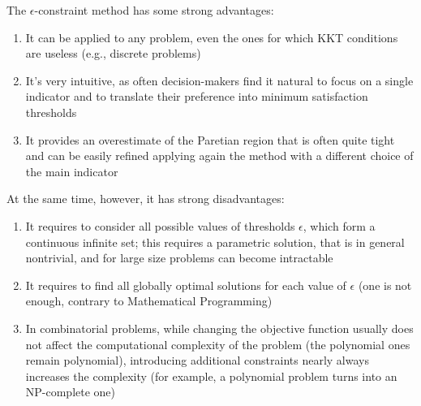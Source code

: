 The $\epsilon$-constraint method has some strong advantages:
\begin{enumerate}
	\item It can be applied to any problem, even the ones for which KKT conditions are useless (e.g., discrete problems)
	
	\item It's very intuitive, as often decision-makers find it natural to focus on a single indicator and to translate their preference into minimum satisfaction thresholds
	
	\item It provides an overestimate of the Paretian region that is often quite tight and can be easily refined applying again the method with a different choice of the main indicator
\end{enumerate}

At the same time, however, it has strong disadvantages: 
\begin{enumerate}
	\item It requires to consider all possible values of thresholds $\epsilon$, which form a continuous infinite set; this requires a parametric solution, that is in general nontrivial, and for large size problems can become intractable
	
	\item It requires to find all globally optimal solutions for each value of $\epsilon$ (one is not enough, contrary to Mathematical Programming)
	
	\item In combinatorial problems, while changing the objective function usually does not affect the computational complexity of the problem (the polynomial ones remain polynomial), introducing additional constraints nearly always increases the complexity (for example, a polynomial problem turns into an NP-complete one)
\end{enumerate}

